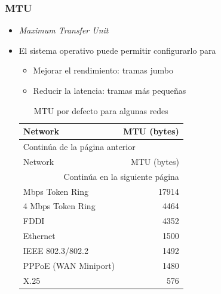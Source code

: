\documentclass{article}
\begin{document}
\subsubsection{MTU}
\label{sec:orgbcb19cc}
\begin{itemize}
\item \emph{Maximum Transfer Unit}
\item El sistema operativo puede permitir configurarlo para 
\begin{itemize}
\item Mejorar el rendimiento: tramas jumbo
\item Reducir la latencia: tramas más pequeñas
\end{itemize}

\begin{longtable}{lr}
\caption{MTU por defecto para algunas redes}
\\
Network & MTU (bytes)\\
\hline
\endfirsthead
\multicolumn{2}{l}{Continúa de la página anterior} \\
\hline

Network & MTU (bytes) \\

\hline
\endhead
\hline\multicolumn{2}{r}{Continúa en la siguiente página} \\
\endfoot
\endlastfoot
\hline
16 Mbps Token Ring & 17914\\
4 Mbps Token Ring & 4464\\
FDDI & 4352\\
Ethernet & 1500\\
IEEE 802.3/802.2 & 1492\\
PPPoE (WAN Miniport) & 1480\\
X.25 & 576\\
\end{longtable}
\end{itemize}
\end{document}
